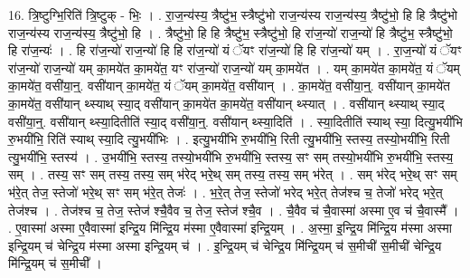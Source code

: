 \documentclass[17pt]{extarticle}
\begin{document}
16. त्रि॒ष्टुग्भि॒रिति॑ त्रि॒ष्टुक् - भिः॒ । . रा॒ज॒न्य॑स्य॒ त्रैष्टु॑भ॒ स्त्रैष्टु॑भो राज॒न्य॑स्य राज॒न्य॑स्य॒ त्रैष्टु॑भो॒ हि हि त्रैष्टु॑भो राज॒न्य॑स्य राज॒न्य॑स्य॒ त्रैष्टु॑भो॒ हि । . त्रैष्टु॑भो॒ हि हि त्रैष्टु॑भ॒ स्त्रैष्टु॑भो॒ हि रा॑ज॒न्यो॑ राज॒न्यो॑ हि त्रैष्टु॑भ॒ स्त्रैष्टु॑भो॒ हि रा॑ज॒न्यः॑ । . हि रा॑ज॒न्यो॑ राज॒न्यो॑ हि हि रा॑ज॒न्यो॑ यं ॅयꣳ रा॑ज॒न्यो॑ हि हि रा॑ज॒न्यो॑ यम् । . रा॒ज॒न्यो॑ यं ॅयꣳ रा॑ज॒न्यो॑ राज॒न्यो॑ यम् का॒मये॑त का॒मये॑त॒ यꣳ रा॑ज॒न्यो॑ राज॒न्यो॑ यम् का॒मये॑त । . यम् का॒मये॑त का॒मये॑त॒ यं ॅयम् का॒मये॑त॒ वसी॑या॒न्॒. वसी॑यान् का॒मये॑त॒ यं ॅयम् का॒मये॑त॒ वसी॑यान् । . का॒मये॑त॒ वसी॑या॒न्॒. वसी॑यान् का॒मये॑त का॒मये॑त॒ वसी॑यान् थ्स्याथ् स्या॒द् वसी॑यान् का॒मये॑त का॒मये॑त॒ वसी॑यान् थ्स्यात् । . वसी॑यान् थ्स्याथ् स्या॒द् वसी॑या॒न्॒. वसी॑यान् थ्स्या॒दितीति॑ स्या॒द् वसी॑या॒न्॒. वसी॑यान् थ्स्या॒दिति॑ । . स्या॒दितीति॑ स्याथ् स्या॒ दित्यु॒भयी॑भि रु॒भयी॑भि॒ रिति॑ स्याथ् स्या॒दि त्यु॒भयी॑भिः । . इत्यु॒भयी॑भि रु॒भयी॑भि॒ रिती त्यु॒भयी॑भि॒ स्तस्य॒ तस्यो॒भयी॑भि॒ रिती त्यु॒भयी॑भि॒ स्तस्य॑ । . उ॒भयी॑भि॒ स्तस्य॒ तस्यो॒भयी॑भि रु॒भयी॑भि॒ स्तस्य॒ सꣳ सम् तस्यो॒भयी॑भि रु॒भयी॑भि॒ स्तस्य॒ सम् । . तस्य॒ सꣳ सम् तस्य॒ तस्य॒ सम् भ॑रेद् भरे॒थ् सम् तस्य॒ तस्य॒ सम् भ॑रेत् । . सम् भ॑रेद् भरे॒थ् सꣳ सम् भ॑रे॒त् तेज॒ स्तेजो॑ भरे॒थ् सꣳ सम् भ॑रे॒त् तेजः॑ । . भ॒रे॒त् तेज॒ स्तेजो॑ भरेद् भरे॒त् तेज॑श्च च॒ तेजो॑ भरेद् भरे॒त् तेज॑श्च । . तेज॑श्च च॒ तेज॒ स्तेज॑ श्चै॒वैव च॒ तेज॒ स्तेज॑ श्चै॒व । . चै॒वैव च॑ चै॒वास्मा॑ अस्मा ए॒व च॑ चै॒वास्मै᳚ । . ए॒वास्मा॑ अस्मा ए॒वैवास्मा॑ इन्द्रि॒य मि॑न्द्रि॒य म॑स्मा ए॒वैवास्मा॑ इन्द्रि॒यम् । . अ॒स्मा॒ इ॒न्द्रि॒य मि॑न्द्रि॒य म॑स्मा अस्मा इन्द्रि॒यम् च॑ चेन्द्रि॒य म॑स्मा अस्मा इन्द्रि॒यम् च॑ । . इ॒न्द्रि॒यम् च॑ चेन्द्रि॒य मि॑न्द्रि॒यम् च॑ स॒मीची॑ स॒मीची॑ चेन्द्रि॒य मि॑न्द्रि॒यम् च॑ स॒मीची᳚ । \newline
\end{document}
